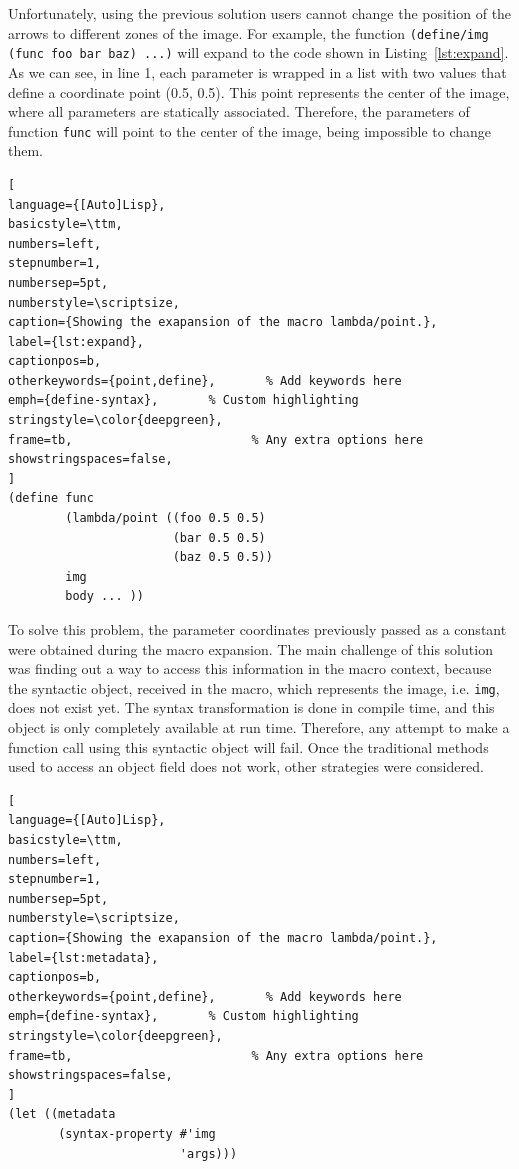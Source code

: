 Unfortunately, using the previous solution users cannot change the position of the arrows to different zones of the image. For example, the function \texttt{(define/img (func foo bar baz) ...)} will expand to the code shown in Listing~\ref{lst:expand}. As we can see, in line 1, each parameter is wrapped in a list with two values that define a coordinate point (0.5, 0.5). This point represents the center of the image, where all parameters are statically associated. Therefore, the parameters of function \texttt{func} will point to the center of the image, being impossible to change them. \\

\begin{lstlisting}[
language={[Auto]Lisp},
basicstyle=\ttm,
numbers=left,
stepnumber=1,
numbersep=5pt,                   
numberstyle=\scriptsize, 
caption={Showing the exapansion of the macro lambda/point.},
label={lst:expand},
captionpos=b, 
otherkeywords={point,define},       % Add keywords here
emph={define-syntax},       % Custom highlighting
stringstyle=\color{deepgreen},
frame=tb,                         % Any extra options here
showstringspaces=false,
]
(define func 
        (lambda/point ((foo 0.5 0.5) 
                       (bar 0.5 0.5)
                       (baz 0.5 0.5)) 
        img 
        body ... ))
\end{lstlisting}

To solve this problem, the parameter coordinates previously passed as a constant were obtained during the macro expansion. The main challenge of this solution was finding out a way to access this information in the macro context, because the syntactic object,  received in the macro, which represents the image, i.e. \texttt{img}, does not exist yet. The syntax transformation is done in compile time, and this object is only completely available at run time. Therefore, any attempt to make a function call using this syntactic object will fail. Once the traditional methods used to access an object field does not work, other strategies were considered. 

\begin{lstlisting}[
language={[Auto]Lisp},
basicstyle=\ttm,
numbers=left,
stepnumber=1,
numbersep=5pt,                   
numberstyle=\scriptsize, 
caption={Showing the exapansion of the macro lambda/point.},
label={lst:metadata},
captionpos=b, 
otherkeywords={point,define},       % Add keywords here
emph={define-syntax},       % Custom highlighting
stringstyle=\color{deepgreen},
frame=tb,                         % Any extra options here
showstringspaces=false,
]
(let ((metadata 
       (syntax-property #'img 
                        'args)))
\end{lstlisting}



